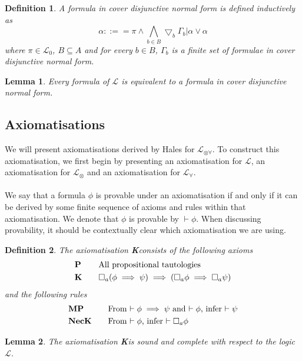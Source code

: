 \documentclass[12pt, a4paper, titlepage]{scrartcl}
\newtheorem{defn}{Definition}[subsection]
\newtheorem{lemma}{Lemma}[subsection]
\numberwithin{equation}{section}
\newcommand{\cover}{\bigtriangledown}
\newcommand{\lang}{\mathcal{L}}
\newcommand{\langRefine}{\lang_{\forall}}
\newcommand{\langActEx}{\lang_{\otimes}}
\newcommand{\langArbAct}{\lang_{\otimes\forall}}
\newcommand{\langProp}{\lang_0}
\newcommand{\AXK}{{\bf K}}
\newcommand{\axP}{{\bf P}}
\newcommand{\axK}{{\bf K}}
\newcommand{\axMP}{{\bf MP}}
\newcommand{\axNecK}{{\bf NecK}}
\newcommand{\FIXME}{{\bf FIXME}}
\begin{document}

\begin{defn} \label{coverNormal}
A formula in cover disjunctive normal form is defined inductively as
\[
	\alpha ::== \pi \land \bigwedge_{b \in B} \cover_b \Gamma_b | \alpha \lor \alpha
\]
where $\pi \in \langProp$, $B \subseteq A$ and for every $b \in B$, $\Gamma_b$ is a finite set of
formulae in cover disjunctive normal form.
\end{defn}

\begin{lemma} \label{allInCoverNormal}
Every formula of $\lang$ is equivalent to a formula in cover disjunctive normal form.
\end{lemma}

\subsection{Axiomatisations}
We will present axiomatisations derived by Hales for $\langArbAct$.
To construct this axiomatisation, we first begin by presenting an axiomatisation for $\lang$, an
axiomatisation for $\langActEx$ and an axiomatisation for $\langRefine$.\\
\\
We say that a formula $\phi$ is provable under an axiomatisation if and only if it can be derived by
some finite sequence of axioms and rules within that axiomatisation.
We denote that $\phi$ is provable by $\vdash \phi$.
When discussing provability, it should be contextually clear which axiomatisation we are using.

\begin{defn} \label{axiomK}
The axiomatisation \AXK consists of the following axioms
\begin{alignat*}{2}
	& \axP && \quad \text{All propositional tautologies} \\
	& \axK && \quad \Box_a(\phi \implies \psi) \implies (\Box_a \phi \implies \Box_a \psi)
\end{alignat*}
and the following rules
\begin{alignat*}{2}
	& \axMP && \quad \text{From $\vdash \phi \implies \psi$ and $\vdash \phi$, infer $\vdash \psi$} \\
	& \axNecK && \quad \text{From $\vdash \phi$, infer $\vdash \Box_a \phi$}
\end{alignat*}
\end{defn}

\begin{lemma} \label{axiomKSoundComplete}
The axiomatisation \AXK is sound and complete with respect to the logic $\lang$.
\end{lemma}
\end{document}
